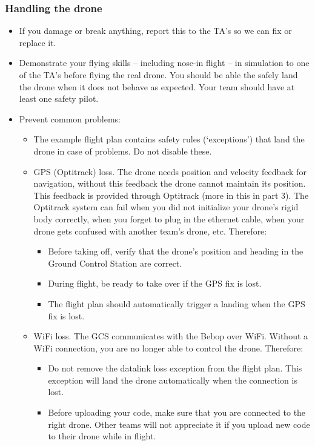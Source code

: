 \documentclass{article}
\begin{document}
\subsubsection*{Handling the drone}
\begin{itemize}
\item If you damage or break anything, report this to the TA's so we can fix or replace it.
\item Demonstrate your flying skills -- including nose-in flight -- in simulation to one of the TA's before flying the real drone. You should be able the safely land the drone when it does not behave as expected. Your team should have at least one safety pilot.
\item Prevent common problems:
\begin{itemize}
\item The example flight plan contains safety rules (`exceptions') that land the drone in case of problems. Do not disable these.
\item GPS (Optitrack) loss. The drone needs position and velocity feedback for navigation, without this feedback the drone cannot maintain its position. This feedback is provided through Optitrack (more in this in part 3). The Optitrack system can fail when you did not initialize your drone's rigid body correctly, when you forget to plug in the ethernet cable, when your drone gets confused with another team's drone, etc. Therefore:
\begin{itemize}
\item Before taking off, verify that the drone's position and heading in the Ground Control Station are correct.
\item During flight, be ready to take over if the GPS fix is lost.
\item The flight plan should automatically trigger a landing when the GPS fix is lost.
\end{itemize}
\item WiFi loss. The GCS communicates with the Bebop over WiFi. Without a WiFi connection, you are no longer able to control the drone. Therefore:
\begin{itemize}
\item Do not remove the datalink loss exception from the flight plan. This exception will land the drone automatically when the connection is lost.
\item Before uploading your code, make sure that you are connected to the right drone. Other teams will not appreciate it if you upload new code to their drone while in flight.

\end{itemize}
\end{itemize}
\end{itemize}
\end{document}

